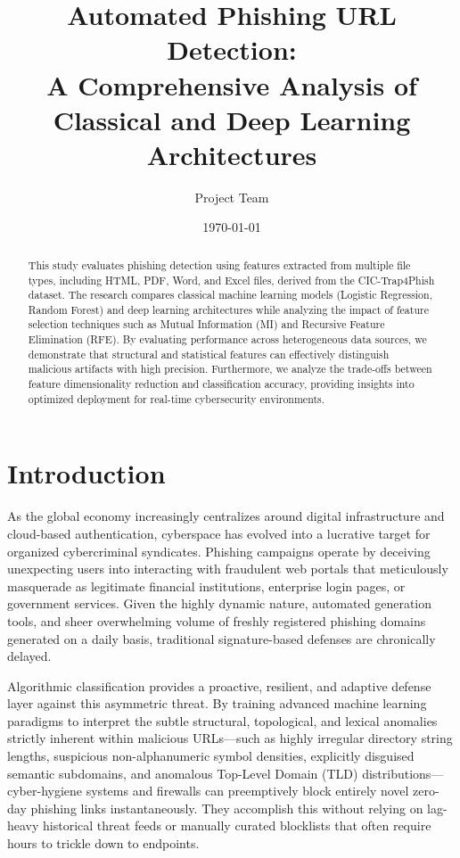 \documentclass[12pt,a4paper]{article}
\title{\huge \textbf{Automated Phishing URL Detection: \\ A Comprehensive Analysis of Classical and Deep Learning Architectures}}
\author{Project Team}
\date{\today}
\begin{document}
\maketitle

\thispagestyle{empty}

\begin{abstract}
This study evaluates phishing detection using features extracted from multiple file types, including HTML, PDF, Word, and Excel files, derived from the CIC-Trap4Phish dataset. The research compares classical machine learning models (Logistic Regression, Random Forest) and deep learning architectures while analyzing the impact of feature selection techniques such as Mutual Information (MI) and Recursive Feature Elimination (RFE). By evaluating performance across heterogeneous data sources, we demonstrate that structural and statistical features can effectively distinguish malicious artifacts with high precision. Furthermore, we analyze the trade-offs between feature dimensionality reduction and classification accuracy, providing insights into optimized deployment for real-time cybersecurity environments.
\end{abstract}

\newpage
\tableofcontents
\newpage

\section{Introduction}
As the global economy increasingly centralizes around digital infrastructure and cloud-based authentication, cyberspace has evolved into a lucrative target for organized cybercriminal syndicates. Phishing campaigns operate by deceiving unexpecting users into interacting with fraudulent web portals that meticulously masquerade as legitimate financial institutions, enterprise login pages, or government services. Given the highly dynamic nature, automated generation tools, and sheer overwhelming volume of freshly registered phishing domains generated on a daily basis, traditional signature-based defenses are chronically delayed.

Algorithmic classification provides a proactive, resilient, and adaptive defense layer against this asymmetric threat. By training advanced machine learning paradigms to interpret the subtle structural, topological, and lexical anomalies strictly inherent within malicious URLs—such as highly irregular directory string lengths, suspicious non-alphanumeric symbol densities, explicitly disguised semantic subdomains, and anomalous Top-Level Domain (TLD) distributions—cyber-hygiene systems and firewalls can preemptively block entirely novel zero-day phishing links instantaneously. They accomplish this without relying on lag-heavy historical threat feeds or manually curated blocklists that often require hours to trickle down to endpoints.
\end{document}
